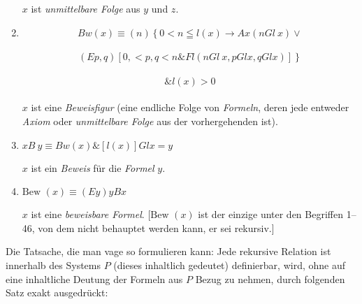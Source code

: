 \documentclass[draft]{scrartcl}
\begin{document}
\begin{enumerate}[1.]
	$x$ ist \textit{unmittelbare Folge} aus $y$ und $z$.

	\item {}$$
		Bw\left(x\right) \equiv \left(n\right)\left\{0 < n \leqq l\left(x\right) \longrightarrow Ax\left(n Gl\ x\right) \lor \right.
	$$\\[\spacebetweenbreakedequations]
	$$	\left.\left(Ep, q\right) \left[0, < p, q < n \& Fl\left(n Gl\ x, p Gl x, q Gl x\right)\right]\right\}
	$$\\[\spacebetweenbreakedequations]
	$$
		\& l\left(x\right) > 0
	$$\\[\spaceafterbreakedequation]

	$x$ ist eine \textit{Beweisfigur} (eine endliche Folge von \textit{Formeln}, deren jede entweder \textit{Axiom} oder \textit{unmittelbare Folge} aus der vorhergehenden ist).

	\item {}$x B\ y \equiv Bw\left(x\right) \& \left[ l\left(x\right) \right] Gl x = y$%

	$x$ ist ein \textit{Beweis} für die \textit{Formel} $y$.

	\item {}$\text{Bew }\left(x\right) \equiv \left(Ey\right) y B x$

	$x$ ist eine \textit{beweisbare Formel}. [$\text{Bew }\left(x\right)$ ist der einzige unter den Begriffen 1--46, von dem nicht behauptet werden kann, er sei rekursiv.]
\end{enumerate}

Die Tatsache, die man vage so formulieren kann: Jede rekursive Relation
ist innerhalb des Systems $P$ (dieses inhaltlich gedeutet) definierbar, wird,
ohne auf eine inhaltliche Deutung der Formeln
aus $P$ Bezug zu nehmen,
durch folgenden Satz exakt ausgedrückt:
\end{document}
